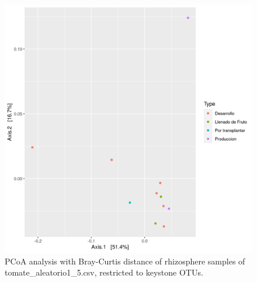 \begin{figure}
  \centering
  \includegraphics[scale = 0.7]{pcoa_key_otus_tomate_aleatorio1_5.csv.png}
  \caption{PCoA analysis with Bray-Curtis distance of rhizosphere samples of tomate_aleatorio1_5.csv, restricted to keystone OTUs.}
  \label{fig:tomate_aleatorio1_5.csv_pcoa_key_otus}
\end{figure}
